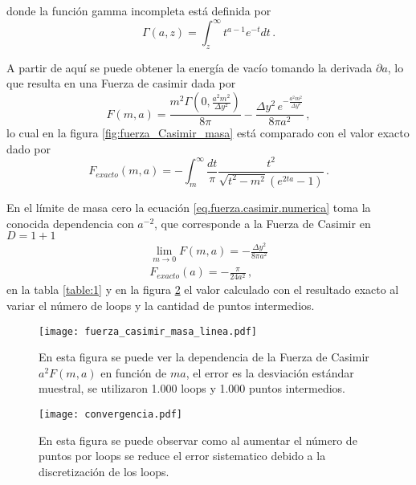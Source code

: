 donde la función gamma incompleta está definida por
\begin{equation*}
\Gamma (a, z) = \int _{z} ^{\infty} t^{a-1} e ^{-t} dt
\, .
\end{equation*}

A partir de aquí se puede obtener la energía de vacío tomando la derivada  $\partial a$, lo que resulta en una Fuerza de casimir dada por
\begin{equation}
F (m,a) = 
\frac{m^2 \Gamma \left( 0 , \frac{a ^2 m^2}{\Delta y^2} \right)}{8 \pi}
- \frac{\Delta y^2 \, e ^ {-\frac{a ^2 m^2}{\Delta y^2}}}{8 \pi a^2 } 
\, ,
\label{eq.fuerza.casimir.numerica}
\end{equation}
lo cual en la figura \eqref{fig:fuerza_Casimir_masa} está comparado con el valor exacto dado por
\begin{equation}
F _{exacto} (m,a) = - \int _{m} ^{ \infty } \frac{dt}{\pi} \frac{t^2}{\sqrt{t^2 -m^2}(e^{2 t a} -1)}
\, .
\end{equation}


En el límite de masa cero la ecuación \eqref{eq.fuerza.casimir.numerica}  toma la conocida dependencia con $a^{-2}$, que corresponde a la Fuerza de Casimir en $D = 1+1$
\begin{align}
\lim _{m \rightarrow 0} F(m,a) = - \frac{\Delta y^2}{8 \pi a^2} \\
F _{exacto} (a) = - \frac{\pi}{24 a^2}
\, ,
\end{align}
en la tabla \ref{table:1} y en la figura \ref{fig:convergencia_loops} el valor calculado con el resultado exacto al variar el número de loops y la cantidad de puntos intermedios.




\begin{figure}
    \centering
    \texttt{[image: fuerza\_casimir\_masa\_linea.pdf]}
    \caption{En esta figura se puede ver la dependencia de la Fuerza de Casimir $a^2 F(m,a)$ en función de $m a$, el error es la desviación estándar muestral, se utilizaron 1.000 loops y 1.000 puntos intermedios.}
    \label{fig:fuerza_Casimir_masa}
\end{figure}


\begin{figure}
    \centering
    \texttt{[image: convergencia.pdf]}
    \caption{En esta figura se puede observar como al aumentar el número de puntos por loops se reduce el error sistematico debido a la discretización de los loops.}
    \label{fig:convergencia_loops}
\end{figure}



